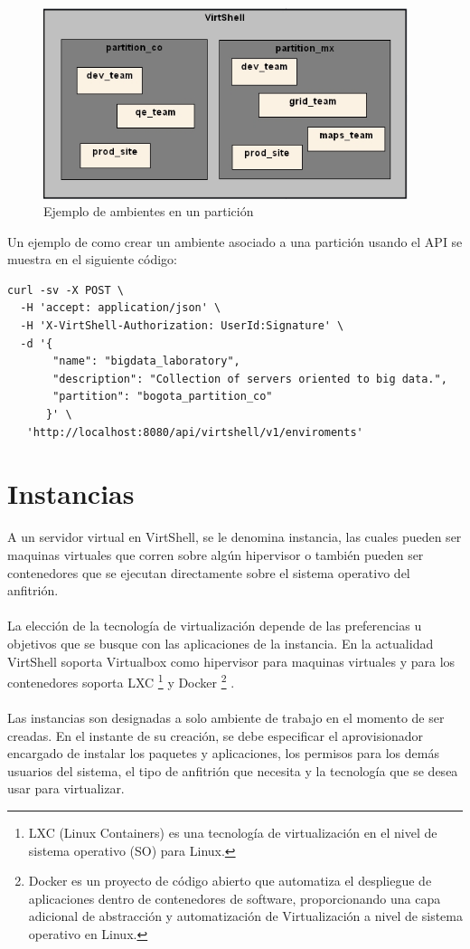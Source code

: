 \begin{figure}[h]
    \centering
  \caption{Ejemplo de ambientes en un partición}
  \label{fig:enviroment}
  \includegraphics[width = 0.95\textwidth]{../architecture/v1/diagrams/enviroments}
\end{figure}

Un ejemplo de como crear un ambiente asociado a una partición usando el API se muestra en el siguiente código:

\begin{lstlisting}[style=json, caption=Petición HTTP para crear un ambiente]
curl -sv -X POST \
  -H 'accept: application/json' \
  -H 'X-VirtShell-Authorization: UserId:Signature' \
  -d '{
       "name": "bigdata_laboratory",
       "description": "Collection of servers oriented to big data.", 
       "partition": "bogota_partition_co"
      }' \
   'http://localhost:8080/api/virtshell/v1/enviroments'
\end{lstlisting}

\section{Instancias}
A un servidor virtual en VirtShell, se le denomina instancia, las cuales pueden ser maquinas virtuales que corren sobre algún hipervisor o también pueden ser contenedores que se ejecutan directamente sobre el sistema operativo del anfitrión. \\
\\
La elección de la tecnología de virtualización depende de las preferencias u objetivos que se busque con las aplicaciones de la instancia. En la actualidad VirtShell soporta Virtualbox como hipervisor para maquinas virtuales y para los contenedores soporta LXC \footnote{LXC (Linux Containers) es una tecnología de virtualización en el nivel de sistema operativo (SO) para Linux. } \cite{lxc16} y Docker \footnote{Docker es un proyecto de código abierto que automatiza el despliegue de aplicaciones dentro de contenedores de software, proporcionando una capa adicional de abstracción y automatización de Virtualización a nivel de sistema operativo en Linux.} \cite{docker16}.\\
\\
Las instancias son designadas a solo ambiente de trabajo en el momento de ser creadas. En el instante de su creación, se debe especificar el aprovisionador encargado de instalar los paquetes y aplicaciones, los permisos para los demás usuarios del sistema, el tipo de anfitrión que necesita y la tecnología que se desea usar para virtualizar.

